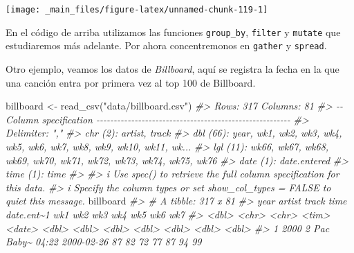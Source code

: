 \documentclass[
]{book}
\newenvironment{Shaded}{\begin{snugshade}}{\end{snugshade}}
\newcommand{\CommentTok}[1]{\textcolor[rgb]{0.56,0.35,0.01}{\textit{#1}}}
\newcommand{\FunctionTok}[1]{\textcolor[rgb]{0.00,0.00,0.00}{#1}}
\newcommand{\NormalTok}[1]{#1}
\newcommand{\OtherTok}[1]{\textcolor[rgb]{0.56,0.35,0.01}{#1}}
\newcommand{\StringTok}[1]{\textcolor[rgb]{0.31,0.60,0.02}{#1}}
\begin{document}
\begin{center}\texttt{[image: \_main\_files/figure-latex/unnamed-chunk-119-1]} \end{center}

En el código de arriba utilizamos las funciones \texttt{group\_by}, \texttt{filter} y \texttt{mutate}
que estudiaremos más adelante. Por ahora concentremonos en \texttt{gather} y \texttt{spread}.

Otro ejemplo, veamos los datos de \emph{Billboard}, aquí se registra la fecha en la
que una canción entra por primera vez al top 100 de Billboard.

\begin{Shaded}
\begin{Highlighting}[]
\NormalTok{billboard }\OtherTok{\textless{}{-}} \FunctionTok{read\_csv}\NormalTok{(}\StringTok{"data/billboard.csv"}\NormalTok{)}
\CommentTok{\#\textgreater{} Rows: 317 Columns: 81}
\CommentTok{\#\textgreater{} {-}{-} Column specification {-}{-}{-}{-}{-}{-}{-}{-}{-}{-}{-}{-}{-}{-}{-}{-}{-}{-}{-}{-}{-}{-}{-}{-}{-}{-}{-}{-}{-}{-}{-}{-}{-}{-}{-}{-}{-}{-}{-}{-}{-}{-}{-}{-}{-}{-}{-}{-}{-}{-}{-}{-}{-}{-}{-}{-}}
\CommentTok{\#\textgreater{} Delimiter: ","}
\CommentTok{\#\textgreater{} chr   (2): artist, track}
\CommentTok{\#\textgreater{} dbl  (66): year, wk1, wk2, wk3, wk4, wk5, wk6, wk7, wk8, wk9, wk10, wk11, wk...}
\CommentTok{\#\textgreater{} lgl  (11): wk66, wk67, wk68, wk69, wk70, wk71, wk72, wk73, wk74, wk75, wk76}
\CommentTok{\#\textgreater{} date  (1): date.entered}
\CommentTok{\#\textgreater{} time  (1): time}
\CommentTok{\#\textgreater{} }
\CommentTok{\#\textgreater{} i Use \textasciigrave{}spec()\textasciigrave{} to retrieve the full column specification for this data.}
\CommentTok{\#\textgreater{} i Specify the column types or set \textasciigrave{}show\_col\_types = FALSE\textasciigrave{} to quiet this message.}
\NormalTok{billboard}
\CommentTok{\#\textgreater{} \# A tibble: 317 x 81}
\CommentTok{\#\textgreater{}     year artist track time  date.ent\textasciitilde{}1   wk1   wk2   wk3   wk4   wk5   wk6   wk7}
\CommentTok{\#\textgreater{}    \textless{}dbl\textgreater{} \textless{}chr\textgreater{}  \textless{}chr\textgreater{} \textless{}tim\textgreater{} \textless{}date\textgreater{}     \textless{}dbl\textgreater{} \textless{}dbl\textgreater{} \textless{}dbl\textgreater{} \textless{}dbl\textgreater{} \textless{}dbl\textgreater{} \textless{}dbl\textgreater{} \textless{}dbl\textgreater{}}
\CommentTok{\#\textgreater{}  1  2000 2 Pac  Baby\textasciitilde{} 04:22 2000{-}02{-}26    87    82    72    77    87    94    99}

\end{Highlighting}
\end{Shaded}
\end{document}

